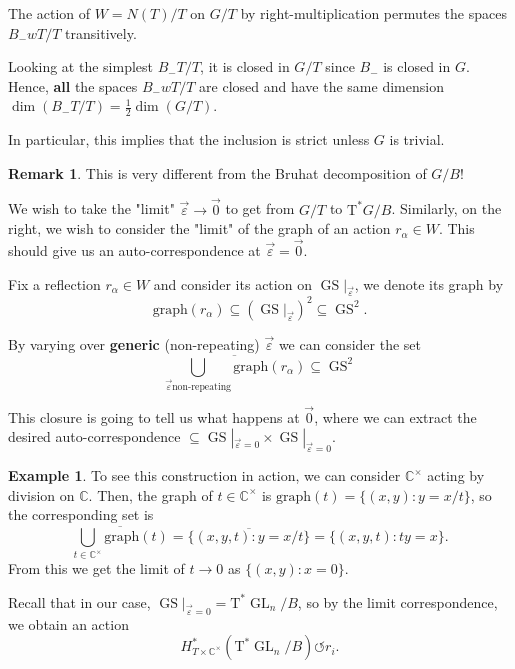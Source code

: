 \documentclass[12pt]{amsart}
\numberwithin{equation}{section}
\theoremstyle{definition}
\newtheorem{Remark}[equation]{Remark}
\newtheorem{Example}[equation]{Example}
\numberwithin{figure}{section}
\newcommand{\C}{\mathbb{C}}
\newcommand{\GL}{\operatorname{GL}}
\newcommand{\GS}{\operatorname{GS}}
\begin{document}
The action of $W = N(T)/T$ on $G/T$ by right-multiplication permutes the spaces $B_- w T/T$ transitively.

Looking at the simplest $B_- T/T$, it is closed in $G/T$ since $B_-$ is closed in $G$. Hence, \textbf{all} the spaces $B_- w T/T$ are closed and have the same dimension $\dim (B_- T/T) = \frac{1}{2} \dim (G/T)$.

In particular, this implies that the inclusion is strict unless $G$ is trivial.

\begin{Remark}
	This is very different from the Bruhat decomposition of $G/B$!
\end{Remark}

We wish to take the "limit" ${\overrightarrow{\varepsilon}} \to {\overrightarrow{0}}$ to get from $G/T$ to $\text{T}^* G/B$. Similarly, on the right, we wish to consider the "limit" of the graph of an action $r_\alpha \in W$. This should give us an auto-correspondence at $\overrightarrow{\varepsilon} = \overrightarrow{0}$.

Fix a reflection $r_\alpha \in W$ and consider its action on $\GS|_{\overrightarrow{\varepsilon}}$, we denote its graph by
\[
	\text{graph}(r_\alpha) \subseteq
	(\GS|_{\overrightarrow{\varepsilon}})^2 \subseteq \GS^2.
\]

By varying over \textbf{generic} (non-repeating) $\overrightarrow{\varepsilon}$ we can consider the set
\[
	\overline{
		\bigcup_{\overrightarrow{\varepsilon}\text{non-repeating}} \text{graph}(r_\alpha)
	}
	\subseteq \GS^2
\]

This closure is going to tell us what happens at $\overrightarrow{0}$, where we can extract the desired auto-correspondence $\subseteq \GS|_{\overrightarrow{\varepsilon}=0} \times \GS|_{\overrightarrow{\varepsilon}=0}$.

\begin{Example}
	To see this construction in action, we can consider $\C^\times$ acting by division on $\C$. Then, the graph of $t \in \C^\times$ is $\text{graph}(t) = \{ (x,y) : y = x/t\}$, so the corresponding set is
	\[
		\overline{
			\bigcup_{t\in \C^\times} \text{graph}(t)
		} =
		\overline{
			\{ (x,y,t) : y=x/t\}
		} = \{ (x,y,t) : t y=x\}.
	\]
	From this we get the limit of $t \to 0$ as $\{(x,y): x=0\}$.
\end{Example}

Recall that in our case, $\GS|_{\overrightarrow{\varepsilon}=0} = \text{T}^* \GL_n/B$, so by the limit correspondence, we obtain an action
\[
	H^*_{T \times \C^\times}(\text{T}^* \GL_n/B) \circlearrowleft r_i.
\]
\end{document}
